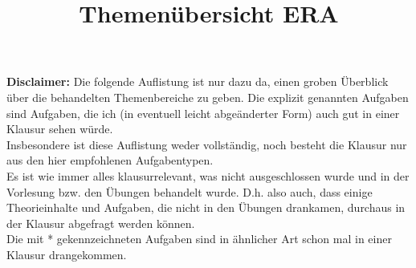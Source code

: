 \documentclass{article}
\title{\vspace{-4cm}Themenübersicht ERA}
\date{}
\author{}
\begin{document}
\maketitle
\vspace{-1.5cm}

\textbf{Disclaimer:} Die folgende Auflistung ist nur dazu da, einen
groben Überblick über die behandelten Themenbereiche zu geben. Die explizit
genannten Aufgaben sind Aufgaben, die ich (in eventuell leicht abgeänderter Form)
auch gut in einer Klausur sehen würde.\\
Insbesondere ist diese Auflistung weder vollständig, noch besteht die
Klausur nur aus den hier empfohlenen Aufgabentypen.\\
Es ist wie immer alles klausurrelevant, was nicht ausgeschlossen wurde
und in der Vorlesung bzw. den Übungen behandelt wurde. D.h. also auch,
dass einige Theorieinhalte und Aufgaben, die nicht in den Übungen drankamen, durchaus
in der Klausur abgefragt werden können.\\
Die mit * gekennzeichneten Aufgaben sind in ähnlicher Art schon mal in einer
Klausur drangekommen.
\end{document}

